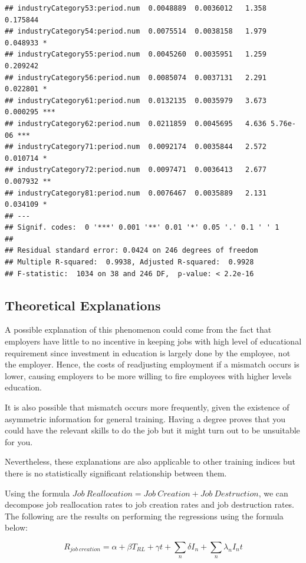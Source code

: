 \documentclass[
]{article}
\begin{document}
\begin{verbatim}
## industryCategory53:period.num  0.0048889  0.0036012   1.358 0.175844    
## industryCategory54:period.num  0.0075514  0.0038158   1.979 0.048933 *  
## industryCategory55:period.num  0.0045260  0.0035951   1.259 0.209242    
## industryCategory56:period.num  0.0085074  0.0037131   2.291 0.022801 *  
## industryCategory61:period.num  0.0132135  0.0035979   3.673 0.000295 ***
## industryCategory62:period.num  0.0211859  0.0045695   4.636 5.76e-06 ***
## industryCategory71:period.num  0.0092174  0.0035844   2.572 0.010714 *  
## industryCategory72:period.num  0.0097471  0.0036413   2.677 0.007932 ** 
## industryCategory81:period.num  0.0076467  0.0035889   2.131 0.034109 *  
## ---
## Signif. codes:  0 '***' 0.001 '**' 0.01 '*' 0.05 '.' 0.1 ' ' 1
## 
## Residual standard error: 0.0424 on 246 degrees of freedom
## Multiple R-squared:  0.9938, Adjusted R-squared:  0.9928 
## F-statistic:  1034 on 38 and 246 DF,  p-value: < 2.2e-16
\end{verbatim}

\hypertarget{theoretical-explanations}{%
\subsection{Theoretical Explanations}\label{theoretical-explanations}}

A possible explanation of this phenomenon could come from the fact that
employers have little to no incentive in keeping jobs with high level of
educational requirement since investment in education is largely done by
the employee, not the employer. Hence, the costs of readjusting
employment if a mismatch occurs is lower, causing employers to be more
willing to fire employees with higher levels education.

It is also possible that mismatch occurs more frequently, given the
existence of asymmetric information for general training. Having a
degree proves that you could have the relevant skills to do the job but
it might turn out to be unsuitable for you.

Nevertheless, these explanations are also applicable to other training
indices but there is no statistically significant relationship between
them.

Using the formula
\(Job\ Reallocation = Job\ Creation + Job\ Destruction\), we can
decompose job reallocation rates to job creation rates and job
destruction rates. The following are the results on performing the
regressions using the formula below:

\[R_{job \ creation} = \alpha + \beta T_{RL} + \gamma t + \sum_n \delta I_n + \sum_n \lambda_n I_n t\]
\end{document}
